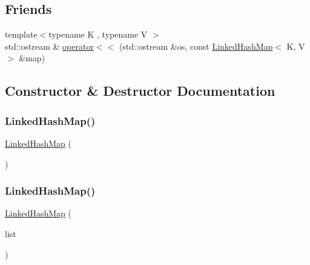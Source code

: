 \subsection*{Friends}
\begin{DoxyCompactItemize}
\item 
{\footnotesize template$<$typename K , typename V $>$ }\\std\+::ostream \& \mbox{\hyperlink{classLinkedHashMap_a98e6d7a4ebf5ff3bcb6a62268ae57280}{operator$<$$<$}} (std\+::ostream \&os, const \mbox{\hyperlink{classLinkedHashMap}{Linked\+Hash\+Map}}$<$ K, V $>$ \&map)
\end{DoxyCompactItemize}


\subsection{Constructor \& Destructor Documentation}
\mbox{\label{classLinkedHashMap_ab932f67a053ddecd3337c7102d4c6809}} 
\subsubsection{\texorpdfstring{Linked\+Hash\+Map()}{LinkedHashMap()}\hspace{0.1cm}{\footnotesize\ttfamily [1/2]}}
{\footnotesize\ttfamily \mbox{\hyperlink{classLinkedHashMap}{Linked\+Hash\+Map}} (\begin{DoxyParamCaption}{ }\end{DoxyParamCaption})}

\mbox{\label{classLinkedHashMap_a769b373146aef8dacb8767f43066d4cd}} 
\subsubsection{\texorpdfstring{Linked\+Hash\+Map()}{LinkedHashMap()}\hspace{0.1cm}{\footnotesize\ttfamily [2/2]}}
{\footnotesize\ttfamily \mbox{\hyperlink{classLinkedHashMap}{Linked\+Hash\+Map}} (\begin{DoxyParamCaption}\item[{std\+::initializer\+\_\+list$<$ std\+::pair$<$ Key\+Type, Value\+Type $>$ $>$}]{list }\end{DoxyParamCaption})}

